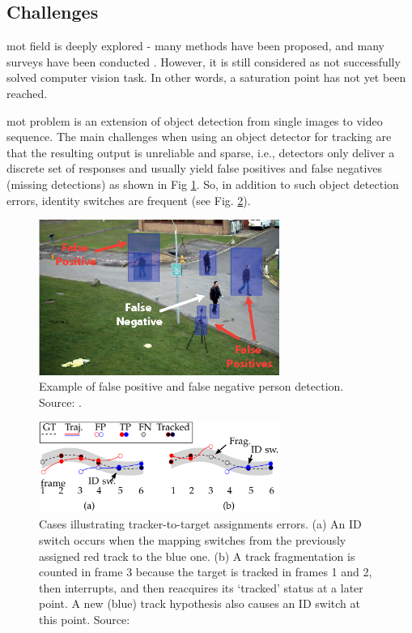 \begin{introduction}
    \section{Challenges}
        \gls{mot} field is deeply explored - many methods have been proposed, and many surveys have been conducted \cite{luo2014multiple, fan2016survey, emami2018machine}. However, it is still considered as not successfully solved computer vision task. In other words, a saturation point has not yet been reached.
        
        \gls{mot} problem is an extension of object detection from single images to video sequence. 
        The main challenges when using an object detector for tracking are that the resulting output is unreliable and sparse, i.e., detectors only deliver a discrete set of responses and usually yield false positives and false negatives (missing detections) as shown in Fig \ref{fig:false positive and false negative}. So, in addition to such object detection errors, identity switches are frequent (see Fig. \ref{fig:id switch example}). 
    
        \begin{figure}[ht]
          \centering
          \includegraphics[width=0.7\textwidth]{resources/false-positive-and-false-negative.png}
          \caption{Example of false positive and false negative person detection. Source: \cite{yao2012interactive}.}
          \label{fig:false positive and false negative}
        \end{figure}
        
    
        \begin{figure}[ht]
          \centering
          \includegraphics[width=0.7\textwidth]{resources/tracking_errors.png}
          \caption{Cases illustrating tracker-to-target assignments errors. (a) An ID switch occurs when the mapping switches from the previously assigned red track to the blue one. (b) A track fragmentation is counted in frame 3 because the target is tracked in frames 1 and 2, then interrupts, and then reacquires its ‘tracked’ status at a later point. A new (blue) track hypothesis also causes an ID switch at this point. Source: \cite{MOTChallenge2015}}
          \label{fig:id switch example}
        \end{figure}
        

\end{introduction}
